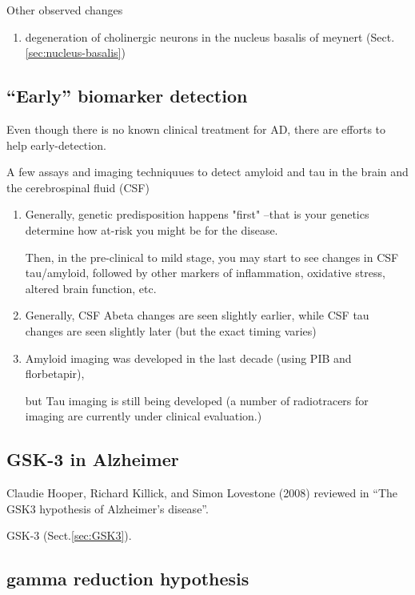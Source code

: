 Other observed changes
\begin{enumerate}
  \item degeneration of cholinergic neurons in the nucleus basalis of meynert
  (Sect.\ref{sec:nucleus-basalis})
\end{enumerate}

\subsection{``Early'' biomarker detection}

Even though there is no known clinical treatment for AD, there are efforts to help early-detection.

A few assays and imaging techniquues to detect amyloid and tau in the brain and
the cerebrospinal fluid (CSF)
\begin{enumerate}
  
  \item Generally, genetic predisposition happens "first" --that is your
  genetics determine how at-risk you might be for the disease.
  
  Then, in the pre-clinical to mild stage, you may start to see changes in CSF
  tau/amyloid, followed by other markers of inflammation, oxidative stress,
  altered brain function, etc.
  
  \item   Generally, CSF Abeta changes are seen slightly earlier, while CSF tau
  changes are seen slightly later (but the exact timing varies)
  
  \item Amyloid imaging was developed in the last decade (using PIB and florbetapir), 
  
  but Tau imaging is still being developed (a number of radiotracers for imaging
  are currently under clinical evaluation.)
  
  
\end{enumerate}


\subsection{GSK-3 in Alzheimer}
\label{sec:GSK-3-in-Alzheimer}

Claudie Hooper, Richard Killick, and Simon Lovestone (2008) reviewed in ``The
GSK3 hypothesis of Alzheimer's disease''.

GSK-3 (Sect.\ref{sec:GSK3}).


\subsection{gamma reduction hypothesis}
\label{sec:gamma-wave-Alzheimer}

